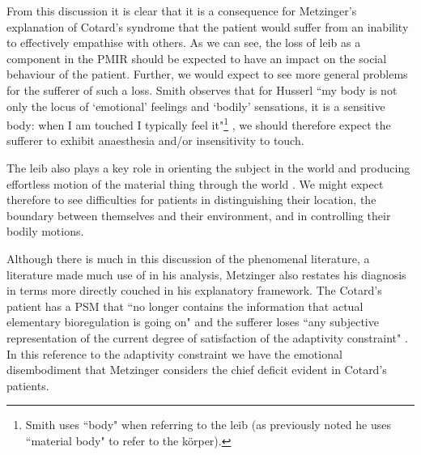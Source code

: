 From this discussion it is clear that it is a consequence for Metzinger's explanation of Cotard's syndrome that the patient would suffer from an inability to effectively empathise with others. As we can see, the loss of leib as a component in the PMIR should be expected to have an impact on the social behaviour of the patient. Further, we would expect to see more general problems for the sufferer of such a loss. Smith observes that for Husserl ``my body is not only the locus of `emotional' feelings and `bodily' sensations, it is a sensitive body: when I am touched I typically feel it"\footnote{Smith uses ``body" when referring to the leib (as previously noted he uses ``material body" to refer to the k\"{o}rper).} \cite[p. 221]{smith2003}, we should therefore expect the sufferer to exhibit anaesthesia and/or insensitivity to touch.

The leib also plays a key role in orienting the subject in the world and producing effortless motion of the material thing through the world \cite[p. 221]{smith2003}. We might expect therefore to see difficulties for patients in distinguishing their location, the boundary between themselves and their environment, and in controlling their bodily motions.

Although there is much in this discussion of the phenomenal literature, a literature made much use of in his analysis, Metzinger also restates his diagnosis in terms more directly couched in his explanatory framework. The Cotard's patient has a PSM that ``no longer contains the information that actual elementary bioregulation is going on" and the sufferer loses ``any subjective representation of the current degree of satisfaction of the adaptivity constraint" \cite[p. 457]{metzinger2003}. In this reference to the adaptivity constraint we have the emotional disembodiment that Metzinger considers the chief deficit evident in Cotard's patients.

